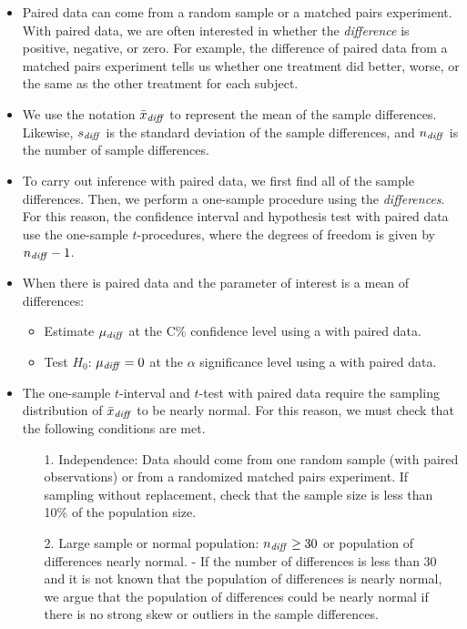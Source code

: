 \begin{itemize} 
\item Paired data can come from a {random sample} or a {matched pairs experiment}.  With paired data, we are often interested in whether the \emph{difference} is positive, negative, or zero.  For example, the difference of paired data from a matched pairs experiment tells us whether one treatment did better, worse, or the same as the other treatment for each subject.

\item We use the notation $\bar{x}_{\text{\emph{diff}}}$ to represent the mean of the sample differences.  Likewise, $s_{\text{\emph{diff}}}$ is the standard deviation of the sample differences, and $n_{\text{\emph{diff}}}$ is the number of sample differences.


\item To carry out inference with paired data, we first find all of the sample differences.  Then, we perform a one-sample procedure using the \emph{differences}.  For this reason, the confidence interval and hypothesis test with paired data use the one-sample $t$-procedures, where the degrees of freedom is given by $n_{\text{\emph{diff}}}-1$.


\item When there is paired data and the parameter of interest is a mean of differences:  
\begin{itemize}
\item Estimate $\mu_{\text{\emph{diff}}}$ at the C\% confidence level using a  with paired data.
\item Test $H_0$: $\mu_{\text{\emph{diff}}}=0$ at the $\alpha$ significance level using a  with paired data. 
\end{itemize}

\item The one-sample $t$-interval and $t$-test with paired data require the sampling distribution of $\bar{x}_{\text{\emph{diff}}}$ to be nearly normal.  For this reason, we must check that the following conditions are met.
\begin{itemize}
\item[1.]  Independence:  Data should come from one random sample (with paired observations) or from a randomized matched pairs experiment.  If sampling without replacement, check that the sample size is less than 10\% of the population size.
\item[2.]  Large sample or normal population:  $n_{\text{\emph{diff}}}\ge 30$ or  population of differences nearly normal.
- If the number of differences is less than 30 and it is not known that the population of differences is nearly normal, we argue that the population of differences could be nearly normal if there is no strong skew or outliers in the sample differences.
\end{itemize}



\end{itemize}
